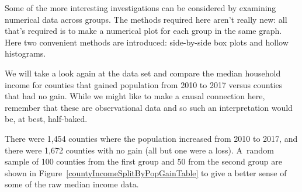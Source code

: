 
Some of the more interesting investigations can be considered
by examining numerical data across groups.
The methods required here aren't really new:
all that's required is to make a numerical plot for each group
in the same graph.
Here two convenient methods are introduced:
side-by-side box plots and hollow histograms.

We will take a look again at the  data set
and compare the median household income for counties that
gained population from 2010 to 2017 versus counties that
had no gain.
While we might like to make a causal connection here,
remember that these are observational data and so such
an interpretation would be, at best, half-baked.

\newcommand{\numcountieswithgains}{1454}
\newcommand{\numcountieswithgainsC}{1,454}
\newcommand{\numcountieswithoutgains}{1672}
\newcommand{\numcountieswithoutgainsC}{1,672}

There were \numcountieswithgainsC{} counties where
the population increased from 2010 to 2017, and there
were \numcountieswithoutgainsC{} counties with no gain
(all but one were a loss).
A~random sample of 100 counties from the first group and
50 from the second group are shown in
Figure~\ref{countyIncomeSplitByPopGainTable}
to give a better sense of some of the raw median
income data.

